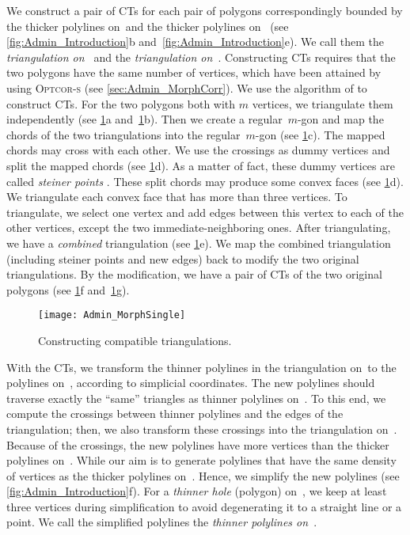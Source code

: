 We construct a pair of CTs
for each pair of polygons correspondingly bounded
by the thicker polylines on~\ml and 
the thicker polylines on~\ms
(see \figs\ref{fig:Admin_Introduction}b
and~\ref{fig:Admin_Introduction}e). 
We call them the \emph{triangulation on~\ml} and 
the \emph{triangulation on~\ms}. 
Constructing CTs requires that
the two polygons have the same number of vertices,
which have been attained by using \textsc{Optcor-s}
(see \sect\ref{sec:Admin_MorphCorr}). 
We use the algorithm of \textcite{AronovSS93}
to construct CTs. 
For the two polygons both with $m$ vertices, 
we triangulate them independently
(see \figs\ref{fig:Admin_ConstructCTs}a 
and~\ref{fig:Admin_ConstructCTs}b). 
Then we create a regular~$m$-gon and 
map the chords of the two triangulations 
into the regular~$m$-gon
(see \figs\ref{fig:Admin_ConstructCTs}c). 
The mapped chords may cross with each other.
We use the crossings as dummy vertices and
split the mapped chords
(see \figs\ref{fig:Admin_ConstructCTs}d). 
As a matter of fact, these dummy vertices are called 
\emph{steiner points} \parencite{AronovSS93}.
These split chords may produce some convex faces
(see \fig\ref{fig:Admin_ConstructCTs}d).
We triangulate each convex face
that has more than three vertices. 
To triangulate, we select one vertex and 
add edges between 
this vertex to each of the other vertices, 
except the two immediate-neighboring ones. 
After triangulating, we have 
a \emph{combined} triangulation
(see \fig\ref{fig:Admin_ConstructCTs}e).
We map the combined triangulation 
(including steiner points and new edges)
back to modify the two original triangulations. 
By the modification, we have a pair of 
CTs of the two original polygons
(see \figs\ref{fig:Admin_ConstructCTs}f 
and~\ref{fig:Admin_ConstructCTs}g).

\begin{figure}[tb]
\centering
\texttt{[image: Admin\_MorphSingle]}
\caption{Constructing compatible triangulations.}
\label{fig:Admin_ConstructCTs}
\end{figure}


With the CTs, 
we transform the thinner polylines in the 
triangulation on~\ml to the polylines on~\ms, 
according to simplicial coordinates. 
The new polylines should traverse exactly the ``same'' 
triangles as thinner polylines on~\ml.
To this end, we compute the crossings 
between thinner polylines and 
the edges of the triangulation; 
then, we also transform these crossings
into the triangulation on~\ms. 
Because of the crossings, the new polylines have
more vertices than the thicker polylines on~\ml. 
While our aim is to generate polylines that have
the same density of vertices as the thicker polylines on~\ms. 
Hence, we simplify the new polylines 
(see \fig\ref{fig:Admin_Introduction}f). 
For a \emph{thinner hole} (polygon) on~\ms, 
we keep at least three vertices during simplification 
to avoid degenerating
it to a straight line or a point.
We call the simplified polylines 
the \emph{thinner polylines on~\ms}.

